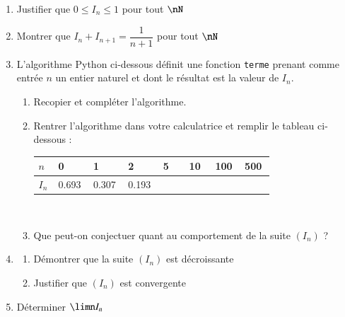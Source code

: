 \documentclass[oneside,12pt]{article}
\begin{document}
\begin{enumerate}
    \item Justifier que $0\leq I_n\leq1$ pour tout $\nN$
    \item Montrer que $I_n+I_{n+1}=\dfrac{1}{n+1}$ pour tout $\nN$
    \item L'algorithme Python ci-dessous définit une fonction \texttt{terme} prenant comme entrée $n$ un entier naturel et dont le résultat est la valeur de $I_n$.
    \begin{center}
    \end{center}
    \begin{enumerate}
        \item Recopier et compléter l'algorithme.
        \item Rentrer l'algorithme dans votre calculatrice et remplir le tableau ci-dessous :\\[5pt]
        \renewcommand{\arraystretch}{1.3}
        \begin{tabular}{|p{0.03\linewidth}|p{0.1\linewidth}|p{0.1\linewidth}|p{0.1\linewidth}|p{0.1\linewidth}|p{0.1\linewidth}|p{0.1\linewidth}|p{0.1\linewidth}|} \hline
            $n$ & 0 & 1 & 2 & 5 & 10 & 100 & 500 \\ \hline
            $I_n$ & 0.693 & 0.307 & 0.193 & & & & \\ \hline
        \end{tabular}\\[5pt]
        \item Que peut-on conjectuer quant au comportement de la suite $(I_n)$ ?
    \end{enumerate}
    \item \begin{enumerate}
        \item Démontrer que la suite $(I_n)$ est décroissante
        \item Justifier que $(I_n)$ est convergente
    \end{enumerate}
    \item Déterminer $\limn I_n$
\end{enumerate}
\end{document}
